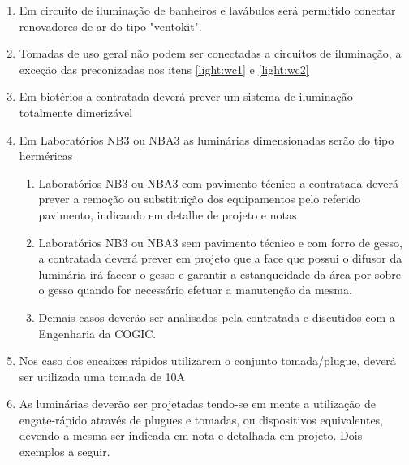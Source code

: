 \begin{enumerate}
		\item\label{light:wc2}Em circuito de iluminação de banheiros e lavábulos será permitido conectar renovadores de ar do tipo "ventokit".
		
		\item Tomadas de uso geral não podem ser conectadas a circuitos de iluminação, a exceção das preconizadas nos itens \ref*{light:wc1} e \ref*{light:wc2}
		
		\item Em biotérios a contratada deverá prever um sistema de iluminação totalmente dimerizável
		
		\item Em Laboratórios NB3 ou NBA3 as luminárias dimensionadas serão do tipo herméricas
		\begin{enumerate}
			\item Laboratórios NB3 ou NBA3 com pavimento técnico a contratada deverá prever a remoção ou substituição dos equipamentos pelo referido pavimento, indicando em detalhe de projeto e notas
			\item Laboratórios NB3 ou NBA3 sem pavimento técnico e com forro de gesso, a contratada deverá prever em projeto que a face que possui o difusor da luminária irá facear o gesso e garantir a estanqueidade da área por sobre o gesso quando for necessário efetuar a manutenção da mesma.
			\item Demais casos deverão ser analisados pela contratada e discutidos com a Engenharia da COGIC.
		\end{enumerate}

		\item\label{light:encaixe10A}Nos caso dos encaixes rápidos utilizarem o conjunto tomada/plugue, deverá ser utilizada uma tomada de 10A
		
		\item As luminárias deverão ser projetadas tendo-se em mente a utilização de engate-rápido através de plugues e tomadas, ou dispositivos equivalentes, devendo a mesma ser indicada em nota e detalhada em projeto. Dois exemplos a seguir.
		

\end{enumerate}
